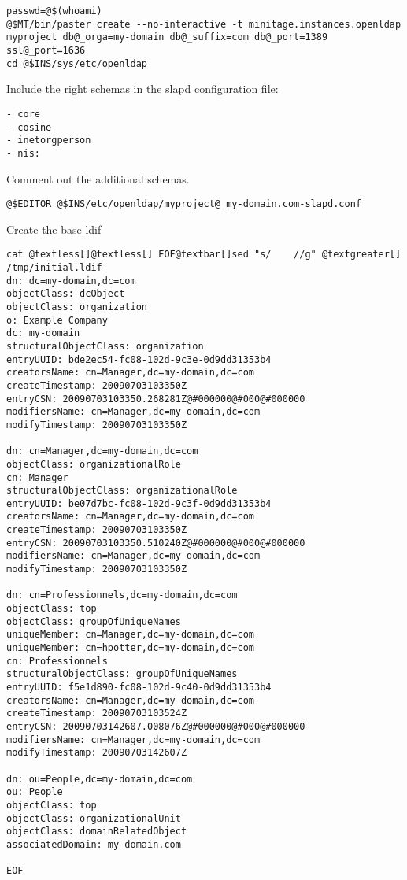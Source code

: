 \documentclass[letterpaper,10pt,english]{sphinxmanual}
\begin{document}
\begin{Verbatim}[commandchars=@\[\]]
passwd=@$(whoami)
@$MT/bin/paster create --no-interactive -t minitage.instances.openldap myproject db@_orga=my-domain db@_suffix=com db@_port=1389 ssl@_port=1636
cd @$INS/sys/etc/openldap
\end{Verbatim}

Include the right schemas in the slapd configuration file:

\begin{Verbatim}[commandchars=@\[\]]
- core
- cosine
- inetorgperson
- nis:
\end{Verbatim}

Comment out the additional schemas.

\begin{Verbatim}[commandchars=@\[\]]
@$EDITOR @$INS/etc/openldap/myproject@_my-domain.com-slapd.conf
\end{Verbatim}

Create the base ldif

\begin{Verbatim}[commandchars=@\[\]]
cat @textless[]@textless[] EOF@textbar[]sed "s/    //g" @textgreater[] /tmp/initial.ldif
dn: dc=my-domain,dc=com
objectClass: dcObject
objectClass: organization
o: Example Company
dc: my-domain
structuralObjectClass: organization
entryUUID: bde2ec54-fc08-102d-9c3e-0d9dd31353b4
creatorsName: cn=Manager,dc=my-domain,dc=com
createTimestamp: 20090703103350Z
entryCSN: 20090703103350.268281Z@#000000@#000@#000000
modifiersName: cn=Manager,dc=my-domain,dc=com
modifyTimestamp: 20090703103350Z

dn: cn=Manager,dc=my-domain,dc=com
objectClass: organizationalRole
cn: Manager
structuralObjectClass: organizationalRole
entryUUID: be07d7bc-fc08-102d-9c3f-0d9dd31353b4
creatorsName: cn=Manager,dc=my-domain,dc=com
createTimestamp: 20090703103350Z
entryCSN: 20090703103350.510240Z@#000000@#000@#000000
modifiersName: cn=Manager,dc=my-domain,dc=com
modifyTimestamp: 20090703103350Z

dn: cn=Professionnels,dc=my-domain,dc=com
objectClass: top
objectClass: groupOfUniqueNames
uniqueMember: cn=Manager,dc=my-domain,dc=com
uniqueMember: cn=hpotter,dc=my-domain,dc=com
cn: Professionnels
structuralObjectClass: groupOfUniqueNames
entryUUID: f5e1d890-fc08-102d-9c40-0d9dd31353b4
creatorsName: cn=Manager,dc=my-domain,dc=com
createTimestamp: 20090703103524Z
entryCSN: 20090703142607.008076Z@#000000@#000@#000000
modifiersName: cn=Manager,dc=my-domain,dc=com
modifyTimestamp: 20090703142607Z

dn: ou=People,dc=my-domain,dc=com
ou: People
objectClass: top
objectClass: organizationalUnit
objectClass: domainRelatedObject
associatedDomain: my-domain.com

EOF
\end{Verbatim}
\end{document}
